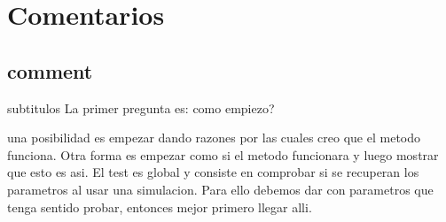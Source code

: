 \documentclass[a4paper,12pt]{article}
\begin{document}
% 
% 
% 



	
	
	\section{Comentarios}
	
	\subsection{comment}
		subtitulos
		La primer pregunta es: como empiezo?
		
		una posibilidad es empezar dando razones por las cuales creo que el metodo funciona. 
		Otra forma es empezar como si el metodo funcionara y luego mostrar que esto es asi. 
		El test es global y consiste en comprobar si se recuperan los parametros al usar una simulacion. Para ello debemos dar con parametros que tenga sentido probar, entonces mejor primero llegar alli. 
		
\end{document}
